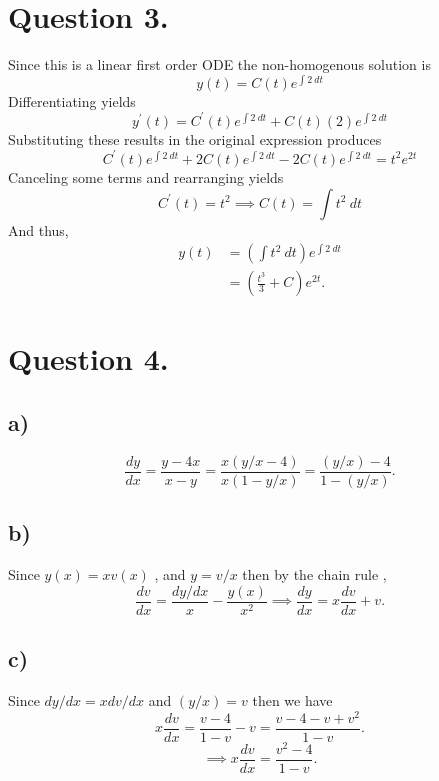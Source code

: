 \documentclass[
	12pt,
	]{article}
\theoremstyle{definition}
\theoremstyle{definition}
\theoremstyle{definition}
\theoremstyle{definition}
\theoremstyle{definition}
\theoremstyle{example}
\theoremstyle{note}
\theoremstyle{remark}
\theoremstyle{example}
\begin{document}
		\section{Question 3.}
			Since this is a linear first order ODE the non-homogenous solution is $$y(t) =C(t)e^{\int 2 \ dt} $$
			Differentiating yields 
			$$ y^{\prime}(t) = C^{\prime}(t) e^{\int 2 \ dt} + C(t)(2)e^{\int 2 \ dt}$$
			Substituting these results in the original expression produces 
			$$ C^{\prime}(t)e^{\int 2 \ dt} + 2C(t)e^{\int  2 \ dt} - 2C(t)e^{\int 2 \ dt} = t^{2}e^{2t}$$
			Canceling some terms and rearranging yields 
			$$ C^{\prime}(t) = t^{2} \implies C(t) = \int t^{2} \ dt$$
			And thus, 
			\begin{align*}
				y(t) &= \left(\int t^{2} \ dt\right)e^{\int 2\ dt} \\
				&= \left(\frac{t^{3}}{3} + C \right)e^{2t}.
			\end{align*}
		\section{Question 4.} 
			\subsection{a) }
			 \begin{equation*}
			 	\frac{dy}{dx} = \frac{y-4x}{x-y} = \frac{x(y/x - 4)}{x(1 - y/x)} = \frac{(y/x) -4}{1 - (y/x)}.
			 \end{equation*}
			 \subsection{b) }
			 	Since $y(x) = xv(x)$ , and $y = v/x$ then by the chain rule , 
			 	$$ \frac{dv}{dx} = \frac{dy/dx}{x} - \frac{y(x)}{x^{2}} \implies \frac{dy}{dx} = x\frac{dv}{dx} + v.$$
			 \subsection{c) }
			 	Since $dy/dx = xdv/dx$ and $(y/x) = v$ then we have 
			 	$$x\frac{dv}{dx} = \frac{v-4}{1-v} -v = \frac{v-4-v+v^{2}}{1-v}. $$
			 	$$ \implies x\frac{dv}{dx} = \frac{v^{2}-4}{1-v}.$$
\end{document}

